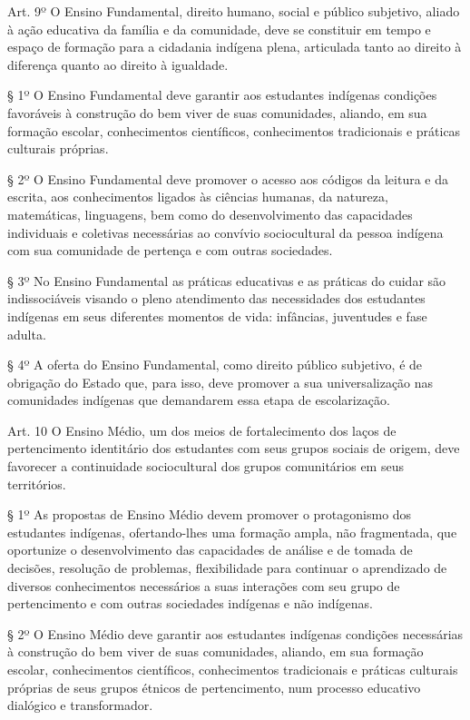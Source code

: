 \documentclass[
]{book}
\begin{document}
Art. 9º O Ensino Fundamental, direito humano, social e público subjetivo, aliado à ação educativa da família e da comunidade, deve se constituir em tempo e espaço de formação para a cidadania indígena plena, articulada tanto ao direito à diferença quanto ao direito à igualdade.

§ 1º O Ensino Fundamental deve garantir aos estudantes indígenas condições favoráveis à construção do bem viver de suas comunidades, aliando, em sua formação escolar, conhecimentos científicos, conhecimentos tradicionais e práticas culturais próprias.

§ 2º O Ensino Fundamental deve promover o acesso aos códigos da leitura e da escrita, aos conhecimentos ligados às ciências humanas, da natureza, matemáticas, linguagens, bem como do desenvolvimento das capacidades individuais e coletivas necessárias ao convívio sociocultural da pessoa indígena com sua comunidade de pertença e com outras sociedades.

§ 3º No Ensino Fundamental as práticas educativas e as práticas do cuidar são indissociáveis visando o pleno atendimento das necessidades dos estudantes indígenas em seus diferentes momentos de vida: infâncias, juventudes e fase adulta.

§ 4º A oferta do Ensino Fundamental, como direito público subjetivo, é de obrigação do Estado que, para isso, deve promover a sua universalização nas comunidades indígenas que demandarem essa etapa de escolarização.

Art. 10 O Ensino Médio, um dos meios de fortalecimento dos laços de pertencimento identitário dos estudantes com seus grupos sociais de origem, deve favorecer a continuidade sociocultural dos grupos comunitários em seus territórios.

§ 1º As propostas de Ensino Médio devem promover o protagonismo dos estudantes indígenas, ofertando-lhes uma formação ampla, não fragmentada, que oportunize o desenvolvimento das capacidades de análise e de tomada de decisões, resolução de problemas, flexibilidade para continuar o aprendizado de diversos conhecimentos necessários a suas interações com seu grupo de pertencimento e com outras sociedades indígenas e não indígenas.

§ 2º O Ensino Médio deve garantir aos estudantes indígenas condições necessárias à construção do bem viver de suas comunidades, aliando, em sua formação escolar, conhecimentos científicos, conhecimentos tradicionais e práticas culturais próprias de seus grupos étnicos de pertencimento, num processo educativo dialógico e transformador.
\end{document}

